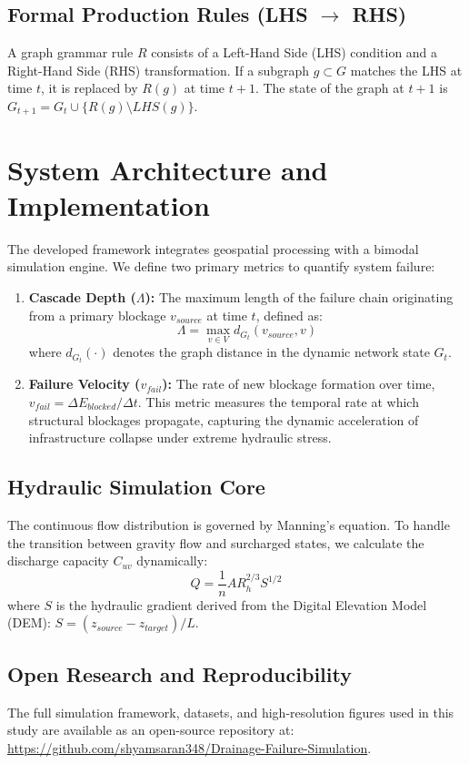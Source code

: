 \documentclass[conference]{IEEEtran}
\begin{document}
\subsection{Formal Production Rules (LHS $\to$ RHS)}
A graph grammar rule $R$ consists of a Left-Hand Side (LHS) condition and a Right-Hand Side (RHS) transformation. If a subgraph $g \subset G$ matches the LHS at time $t$, it is replaced by $R(g)$ at time $t+1$. The state of the graph at $t+1$ is $G_{t+1} = G_t \cup \{R(g) \setminus LHS(g)\}$.

\section{System Architecture and Implementation}
The developed framework integrates geospatial processing with a bimodal simulation engine. We define two primary metrics to quantify system failure:
\begin{enumerate}
    \item \textbf{Cascade Depth ($\Lambda$):} The maximum length of the failure chain originating from a primary blockage $v_{source}$ at time $t$, defined as:
    \begin{equation}
    \Lambda = \max_{v \in V} d_{G_t}(v_{source}, v)
    \end{equation}
    where $d_{G_t}(\cdot)$ denotes the graph distance in the dynamic network state $G_t$.
    \item \textbf{Failure Velocity ($v_{fail}$):} The rate of new blockage formation over time, $v_{fail} = \Delta E_{blocked} / \Delta t$. This metric measures the temporal rate at which structural blockages propagate, capturing the dynamic acceleration of infrastructure collapse under extreme hydraulic stress.
\end{enumerate}

\subsection{Hydraulic Simulation Core}
The continuous flow distribution is governed by Manning's equation. To handle the transition between gravity flow and surcharged states, we calculate the discharge capacity $C_{uv}$ dynamically:
\begin{equation}
Q = \frac{1}{n} A R_h^{2/3} S^{1/2}
\end{equation}
where $S$ is the hydraulic gradient derived from the Digital Elevation Model (DEM): $S = (z_{source} - z_{target}) / L$. 

\subsection{Open Research and Reproducibility}
The full simulation framework, datasets, and high-resolution figures used in this study are available as an open-source repository at: \url{https://github.com/shyamsaran348/Drainage-Failure-Simulation}.
\end{document}
